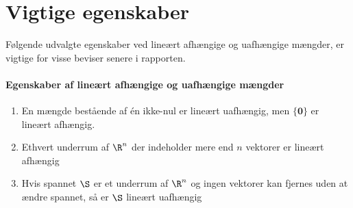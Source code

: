 \chapter{Vigtige egenskaber}
%
Følgende udvalgte egenskaber ved lineært afhængige og uafhængige mængder, er vigtige for visse beviser senere i rapporten.
\subsubsection{Egenskaber af lineært afhængige og uafhængige mængder}\label{egenskab_lin}
\begin{enumerate}
\item En mængde bestående af én ikke-nul er lineært uafhængig, men $\{\textbf{0}\}$ er lineært afhængig.
\item Ethvert underrum af $\R^n$ der indeholder mere end $n$ vektorer er lineært afhængig
\item Hvis spannet $\S$ er et underrum af $\R^n$ og ingen vektorer kan fjernes uden at ændre spannet, så er $\S$ lineært uafhængig
\end{enumerate}

